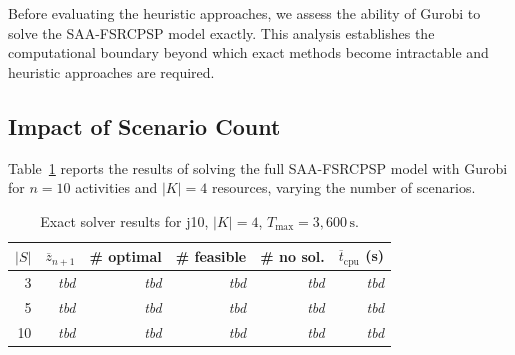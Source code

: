 Before evaluating the heuristic approaches, we assess the
ability of Gurobi to solve the SAA-FSRCPSP model exactly. This
analysis establishes the computational boundary beyond which
exact methods become intractable and heuristic approaches are
required.

\subsection{Impact of Scenario Count}
\label{subsec:exact_scenarios}


Table~\ref{tab:exact_scenarios} reports the results of solving
the full SAA-FSRCPSP model with Gurobi for $n=10$ activities
and $|K|=4$ resources, varying the number of scenarios.

\begin{table}[htbp]
\centering
\renewcommand{\arraystretch}{1.4}
\caption{Exact solver results for j10, $|K|=4$,
         $T_{\max} = 3{,}600\,\text{s}$.}
\label{tab:exact_scenarios}
\begin{tabular}{r r r r r r}
\hline
$|S|$ &
$\overline{z}_{n+1}$ &
\# optimal &
\# feasible &
\# no sol. &
$\overline{t}_{\mathrm{cpu}}$ (s) \\
\hline
3   & \textit{tbd} & \textit{tbd} & \textit{tbd}
    & \textit{tbd} & \textit{tbd} \\
5   & \textit{tbd} & \textit{tbd} & \textit{tbd}
    & \textit{tbd} & \textit{tbd} \\
10  & \textit{tbd} & \textit{tbd} & \textit{tbd}
    & \textit{tbd} & \textit{tbd} \\
\hline
\end{tabular}
\end{table}


